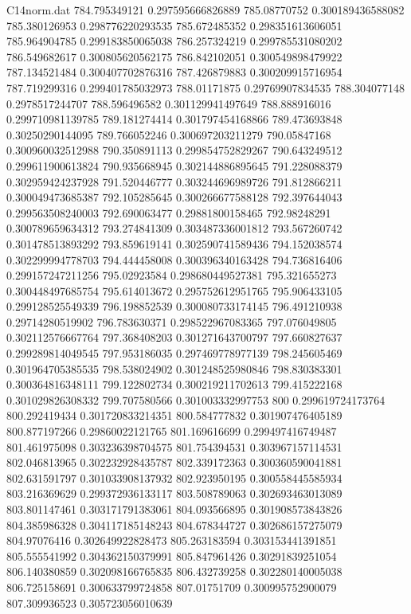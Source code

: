 \begin{filecontents}{C14norm.dat}
784.795349121			0.297595666826889
785.08770752			0.300189436588082
785.380126953			0.298776220293535
785.672485352			0.298351613606051
785.964904785			0.299183850065038
786.257324219			0.299785531080202
786.549682617			0.300805620562175
786.842102051			0.300549898479922
787.134521484			0.300407702876316
787.426879883			0.300209915716954
787.719299316			0.299401785032973
788.01171875			0.29769907834535
788.304077148			0.2978517244707
788.596496582			0.301129941497649
788.888916016			0.299710981139785
789.181274414			0.301797454168866
789.473693848			0.30250290144095
789.766052246			0.300697203211279
790.05847168			0.300960032512988
790.350891113			0.299854752829267
790.643249512			0.299611900613824
790.935668945			0.302144886895645
791.228088379			0.302959424237928
791.520446777			0.303244696989726
791.812866211			0.300049473685387
792.105285645			0.300266677588128
792.397644043			0.299563508240003
792.690063477			0.29881800158465
792.98248291			0.300789659634312
793.274841309			0.303487336001812
793.567260742			0.301478513893292
793.859619141			0.302590741589436
794.152038574			0.302299994778703
794.444458008			0.300396340163428
794.736816406			0.299157247211256
795.02923584			0.298680449527381
795.321655273			0.300448497685754
795.614013672			0.295752612951765
795.906433105			0.299128525549339
796.198852539			0.300080733174145
796.491210938			0.29714280519902
796.783630371			0.298522967083365
797.076049805			0.302112576667764
797.368408203			0.301271643700797
797.660827637			0.299289814049545
797.953186035			0.297469778977139
798.245605469			0.301964705385535
798.538024902			0.301248525980846
798.830383301			0.300364816348111
799.122802734			0.300219211702613
799.415222168			0.301029826308332
799.707580566			0.301003332997753
800			0.299619724173764
800.292419434			0.301720833214351
800.584777832			0.301907476405189
800.877197266			0.29860022121765
801.169616699			0.299497416749487
801.461975098			0.303236398704575
801.754394531			0.303967157114531
802.046813965			0.302232928435787
802.339172363			0.300360590041881
802.631591797			0.301033908137932
802.923950195			0.300558445585934
803.216369629			0.299372936133117
803.508789063			0.302693463013089
803.801147461			0.303171791383061
804.093566895			0.301908573843826
804.385986328			0.304117185148243
804.678344727			0.302686157275079
804.97076416			0.302649922828473
805.263183594			0.303153441391851
805.555541992			0.304362150379991
805.847961426			0.30291839251054
806.140380859			0.302098166765835
806.432739258			0.302280140005038
806.725158691			0.300633799724858
807.01751709			0.300995752900079
807.309936523			0.305723056010639

\end{filecontents}
